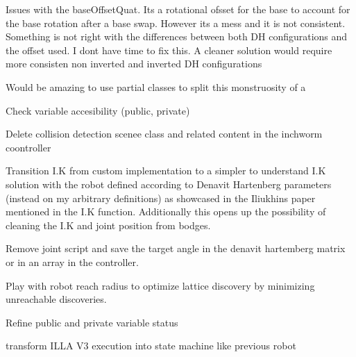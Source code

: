 
\begin{DoxyRefList}
\item[Class \mbox{\hyperlink{class_illa_controller_v3}{Illa\+Controller\+V3}} ]\label{todo__todo000001}%
%
Issues with the base\+Offset\+Quat. Its a rotational ofsset for the base to account for the base rotation after a base swap. However its a mess and it is not consistent. Something is not right with the differences between both DH configurations and the offset used. I dont have time to fix this. A cleaner solution would require more consisten non inverted and inverted DH configurations 



Would be amazing to use partial classes to split this monstruosity of a 



Check variable accesibility (public, private) 



Delete collision detection scenee class and related content in the inchworm coontroller 



Transition I.\+K from custom implementation to a simpler to understand I.\+K solution with the robot defined according to Denavit Hartenberg parameters (instead on my arbitrary definitions) as showcased in the Iliukhin\textquotesingle{}s paper mentioned in the I.\+K function. Additionally this opens up the possibility of cleaning the I.\+K and joint position from bodges. 



Remove joint script and save the target angle in the denavit hartemberg matrix or in an array in the controller. 



Play with robot reach radius to optimize lattice discovery by minimizing unreachable discoveries. 



Refine public and private variable status 



transform ILLA V3 execution into state machine like previous robot 




\end{DoxyRefList}
